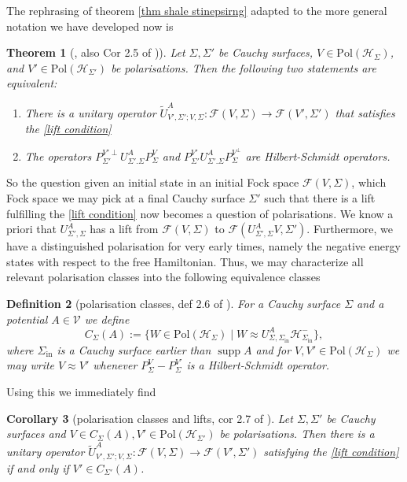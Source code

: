 \documentclass[b5paper,draft,openbib,12pt]{memoir}
\newtheorem{Def}{Definition}
\newtheorem{Thm}[Def]{Theorem}
\newtheorem{Corollary}[Def]{Corollary}
\DeclareMathOperator*{\supp}{supp}
\begin{document}
The rephrasing of theorem \ref{thm shale stinepsirng} 
adapted to the more general notation we have developed now is
\begin{Thm}[\cite{ivp2}, also Cor 2.5 of \cite{deckert2016perspective})]
Let \(\Sigma, \Sigma'\) be Cauchy surfaces, 
\(V\in \text{Pol}(\mathcal{H}_\Sigma)\), and 
\(V'\in \text{Pol}(\mathcal{H}_{\Sigma'})\) be polarisations. 
Then the following two statements are equivalent:
\begin{enumerate}[label=\alph*)]
\item There is a unitary operator 
\(\tilde{U}^A_{V',\Sigma';V, \Sigma}:
\mathcal{F}(V,\Sigma)\rightarrow \mathcal{F}(V',\Sigma')\)
that satisfies the \eqref{lift condition}
\item The operators 
\(P^{{V'}\perp}_{\Sigma'}U^A_{\Sigma'.\Sigma}P^{{V}}_{\Sigma}\) and
\(P^{{V'}}_{\Sigma'}U^A_{\Sigma'.\Sigma}P^{{V}^\perp}_{\Sigma}\) are 
Hilbert-Schmidt operators.
\end{enumerate}
\end{Thm}

So the question given an initial state in an initial Fock space 
\(\mathcal{F}(V,\Sigma)\),
which Fock space we may pick at a final Cauchy surface \(\Sigma'\)
such that there is a lift fulfilling the \eqref{lift condition}
now becomes a question of polarisations. We know a priori 
that \(U^A_{\Sigma',\Sigma}\) has a lift from 
\(\mathcal{F}(V,\Sigma)\) to 
\(\mathcal{F}(U^A_{\Sigma',\Sigma}V,\Sigma')\). Furthermore, we have a 
distinguished polarisation for very early times, namely the negative 
energy states with respect to the free Hamiltonian. Thus, we may 
characterize all relevant polarisation classes into the following
equivalence classes 

\begin{Def}[polarisation classes, def 2.6 of \cite{deckert2016perspective}]\label{def pol class}
For a Cauchy surface \(\Sigma\) and a potential \(A\in\mathcal{V}\) 
we define 
\begin{equation}
C_{\Sigma}(A):=\big\{W\in\text{Pol}(\mathcal{H}_\Sigma)\mid 
W \approx U^A_{\Sigma,\Sigma_{\mathrm{in}}}\mathcal{H}^-_{\Sigma_{\mathrm{in}}}\big\},
\end{equation}
where \(\Sigma_{\mathrm{in}}\) is a Cauchy surface earlier than \(\supp A\)
and for \(V,V'\in\text{Pol}(\mathcal{H}_{\Sigma})\) we may write \(V\approx V'\)
whenever \(P^V_{\Sigma}-P^{V'}_{\Sigma}\) is a Hilbert-Schmidt operator. 
\end{Def}

Using this we immediately find 
\begin{Corollary}[polarisation classes and lifts, cor 2.7 of \cite{deckert2016perspective}]\label{cor: pol class lift}
Let \(\Sigma, \Sigma'\) be Cauchy surfaces and 
\(V\in C_\Sigma(A), V'\in \text{Pol}(\mathcal{H}_{\Sigma'})\) be 
polarisations. Then there is a unitary operator 
\(\tilde{U}^A_{V',\Sigma'; V,\Sigma}:\mathcal{F}(V,\Sigma)
\rightarrow \mathcal{F}(V',\Sigma')\) satisfying the
\eqref{lift condition} if and only if 
\(V'\in C_{\Sigma'}(A)\).
\end{Corollary}
\end{document}
